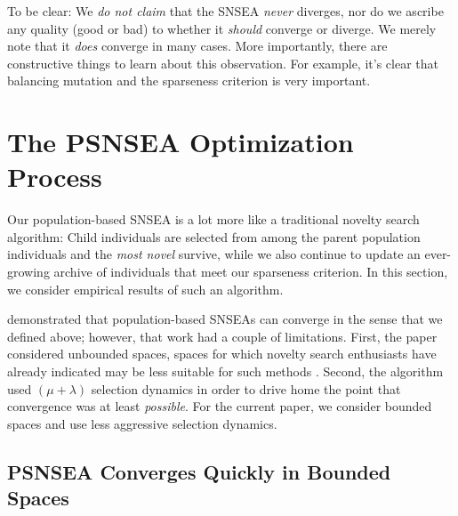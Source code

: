 \documentclass[twoside]{article}
\begin{document}
To be clear:  We \emph{do not claim} that the SNSEA \emph{never} diverges, nor do we ascribe any quality (good or bad) to whether it \emph{should} converge or diverge.  We merely note that it \emph{does} converge in many cases.  More importantly, there are constructive things to learn about this observation.  For example, it's clear that balancing mutation and the sparseness criterion is very important.  %


\section{The PSNSEA Optimization Process}
\label{sec:resultpsnesea}

Our population-based SNSEA is a lot more like a traditional novelty search algorithm:  Child individuals are selected from among the parent population individuals and the \emph{most novel} survive, while we also continue to update an ever-growing archive of individuals that meet our sparseness criterion.  In this section, we consider empirical results of such an algorithm.

\citet{Wiegand2021flairs} demonstrated that population-based SNSEAs can converge in the sense that we defined above; however, that work had a couple of limitations.  First, the paper considered unbounded spaces, spaces for which novelty search enthusiasts have already indicated may be less suitable for such methods \citep{LehmanStanley2008ssls}.  Second, the algorithm used $(\mu+\lambda)$ selection dynamics in order to drive home the point that convergence was at least \emph{possible}.  For the current paper, we consider bounded spaces and use less aggressive selection dynamics.


\subsection{PSNSEA Converges Quickly in Bounded Spaces}
\label{subsec:psnsea:bounded}
\end{document}
